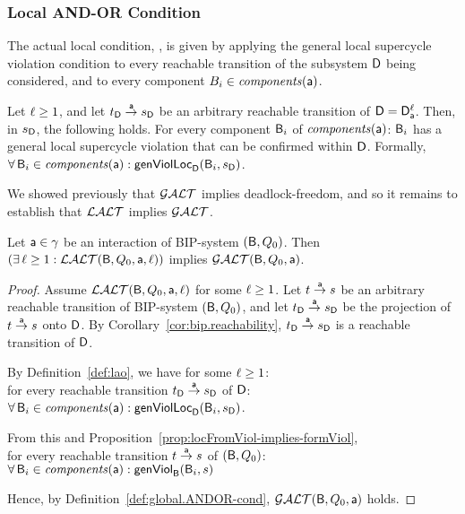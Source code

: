 \subsubsection{Local AND-OR Condition}

The actual local condition, \LAO, is given by applying the general local supercycle violation condition to every reachable transition 
of the subsystem $\dsk{\act}{\l}$ being considered, and to every component $B_i \in \cmps{\act}$.

\begin{definition} \label{def:lao}
Let $\l \ge 1$, and let $\tD \goesto[\act] \sD$ be an arbitrary reachable transition of $\DS = \dsks{\act}{\l}$.
Then, in $\sD$, the following holds. 
For every component $\B_i$ of $\cmps{\act}$:  
$\B_i$ has a general local supercycle violation that can be confirmed within $\dsk{\act}{\l}$.
Formally,\\
\ind  $\fa \B_i \in \cmps{\act} : \locFormViol{\B_i}{\sD}{\act}{\l}$.
\end{definition}
%

%
We showed previously that $\GAO$ implies deadlock-freedom, and so it remains to establish that $\LAO$ implies $\GAO$. 


\begin{lemma}
\label{lemma:loc.ANDOR.implies.glob.AND-OR}
\label{LAOGAO}
Let $\act \in \gamma$ be an interaction of BIP-system $(\B, Q_0)$. Then\\
\ind $(\ex \l \ge 1: \LAO(\B, Q_0, \act, \l))$ implies $\GAO(\B, Q_0, \act)$. 
\end{lemma}
%
\begin{proof}
Assume $\LAO(\B, Q_0, \act, \l)$ for some $\l \ge 1$. 
%
Let $t \goesto[\act] s$ be an arbitrary reachable transition of BIP-system $(\B, Q_0)$, and let 
$\tD \goesto[\act] \sD$ be the projection of $t \goesto[\act] s$ onto $\dsk{\act}{\l}$.
By Corollary~\ref{cor:bip.reachability}, $\tD \goesto[\act] \sD$ is a reachable transition of $\dsk{\act}{\l}$.

\noindent
By Definition~\ref{def:lao}, we have for some $\l \ge 1$:\\
\ind for every reachable transition $\tD \goesto[\act] \sD$ of $\dsk{\act}{\l}$:\\
\ind \ind $\fa \B_i \in \cmps{\act} : \locFormViol{\B_i}{\sD}{\act}{\l}$.

\noindent
From this and Proposition~\ref{prop:locFromViol-implies-formViol},\\
\ind for every reachable transition $t \goesto[\act] s$ of  $(\B, Q_0)$:\\ 
\ind \ind $\fa \B_i \in \cmps{\act} : \formViol{\B_i}{s}$

\noindent
Hence, by Definition~\ref{def:global.ANDOR-cond}, $\GAO(\B, Q_0, \act)$ holds.
\end{proof}



